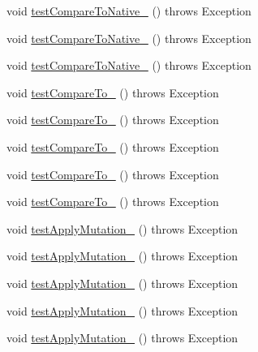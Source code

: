 \begin{DoxyCompactItemize}
\item 
void \hyperlink{classorg_1_1jgap_1_1impl_1_1_integer_gene_test_a3e55460ecfd6e9a92d11255b1cab4862}{test\-Compare\-To\-Native\-\_} ()  throws Exception 
\item 
void \hyperlink{classorg_1_1jgap_1_1impl_1_1_integer_gene_test_ae900fa40f189e617a4a5cc956e408e39}{test\-Compare\-To\-Native\-\_} ()  throws Exception 
\item 
void \hyperlink{classorg_1_1jgap_1_1impl_1_1_integer_gene_test_abc32d11e1df94a89b843ceca99889880}{test\-Compare\-To\-Native\-\_} ()  throws Exception 
\item 
void \hyperlink{classorg_1_1jgap_1_1impl_1_1_integer_gene_test_a05085aaf9e34748d9e35e288c29d331f}{test\-Compare\-To\-\_} ()  throws Exception 
\item 
void \hyperlink{classorg_1_1jgap_1_1impl_1_1_integer_gene_test_a1e5968069d7c7c0c959f8427ac8f0a88}{test\-Compare\-To\-\_} ()  throws Exception 
\item 
void \hyperlink{classorg_1_1jgap_1_1impl_1_1_integer_gene_test_aa9430596dbf47b35b63fb07ff3c930f5}{test\-Compare\-To\-\_} ()  throws Exception 
\item 
void \hyperlink{classorg_1_1jgap_1_1impl_1_1_integer_gene_test_aecd83ad9f00f452b8a6a12c949fc138e}{test\-Compare\-To\-\_} ()  throws Exception 
\item 
void \hyperlink{classorg_1_1jgap_1_1impl_1_1_integer_gene_test_a54a1b365828cc38868aa8b23a021c66a}{test\-Compare\-To\-\_} ()  throws Exception 
\item 
void \hyperlink{classorg_1_1jgap_1_1impl_1_1_integer_gene_test_a77a50cd7fa1906209761ed7593013e40}{test\-Apply\-Mutation\-\_} ()  throws Exception 
\item 
void \hyperlink{classorg_1_1jgap_1_1impl_1_1_integer_gene_test_aa5642cc41ba71ee52b706f7b1bbe6b0f}{test\-Apply\-Mutation\-\_} ()  throws Exception 
\item 
void \hyperlink{classorg_1_1jgap_1_1impl_1_1_integer_gene_test_a7be7f5d13a470432e0c4d4c67eda07a0}{test\-Apply\-Mutation\-\_} ()  throws Exception 
\item 
void \hyperlink{classorg_1_1jgap_1_1impl_1_1_integer_gene_test_a679c0f6623ed1fe8548c66d74552ccbc}{test\-Apply\-Mutation\-\_} ()  throws Exception 
\item 
void \hyperlink{classorg_1_1jgap_1_1impl_1_1_integer_gene_test_a047ff7476395c43c0bc3f16aee467019}{test\-Apply\-Mutation\-\_} ()  throws Exception 
\item 

\end{DoxyCompactItemize}
